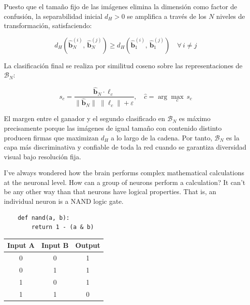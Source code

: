 \documentclass[12pt]{article}
\begin{document}
Puesto que el tamaño fijo de las imágenes elimina la dimensión como factor de confusión,
la separabilidad inicial $d_H > 0$ se amplifica a través de los $N$ niveles de transformación,
satisfaciendo:

\begin{equation}
	d_H\!\left(\hat{\mathbf{b}}_N^{(i)},\, \hat{\mathbf{b}}_N^{(j)}\right)
	\geq d_H\!\left(\hat{\mathbf{b}}_1^{(i)},\, \hat{\mathbf{b}}_1^{(j)}\right)
	\quad \forall\, i \neq j
\end{equation}

La clasificación final se realiza por similitud coseno sobre las representaciones de $\mathcal{B}_N$:

\begin{equation}
	s_c = \frac{\hat{\mathbf{b}}_N \cdot \boldsymbol{\ell}_c}
	{\|\hat{\mathbf{b}}_N\| \; \|\boldsymbol{\ell}_c\| + \varepsilon},
	\quad \hat{c} = \arg\max_{c}\, s_c
\end{equation}

El margen entre el ganador y el segundo clasificado en $\mathcal{B}_N$ es máximo precisamente
porque las imágenes de igual tamaño con contenido distinto producen firmas que maximizan
$d_H$ a lo largo de la cadena. Por tanto, $\mathcal{B}_N$ es la capa más discriminativa
y confiable de toda la red cuando se garantiza diversidad visual bajo resolución fija.





I've always wondered how the brain performs complex mathematical calculations at the neuronal level. How can a group of neurons perform a calculation? It can't be any other way than that neurons have logical properties. That is, an individual neuron is a NAND logic gate.





\begin{tcolorbox}[
	title=python, 
	label=def:python,
	coltitle=black,
	colback=gray!10,    
	colframe=gray!50,   
	height=3cm,          
	width=\textwidth,   
	sharp corners     
	]


\begin{lstlisting}
	def nand(a, b):
		return 1 - (a & b)
\end{lstlisting}


	\vfill 
\end{tcolorbox}



\begin{center}
	\begin{tabular}{|c|c|c|} 
		\hline
		\textbf{Input A} & \textbf{Input B} & \textbf{Output} \\ \hline
		0 & 0 & 1 \\ \hline
		0 & 1 & 1 \\ \hline
		1 & 0 & 1 \\ \hline
		1 & 1 & 0 \\ \hline
	\end{tabular}
\end{center}
\end{document}
